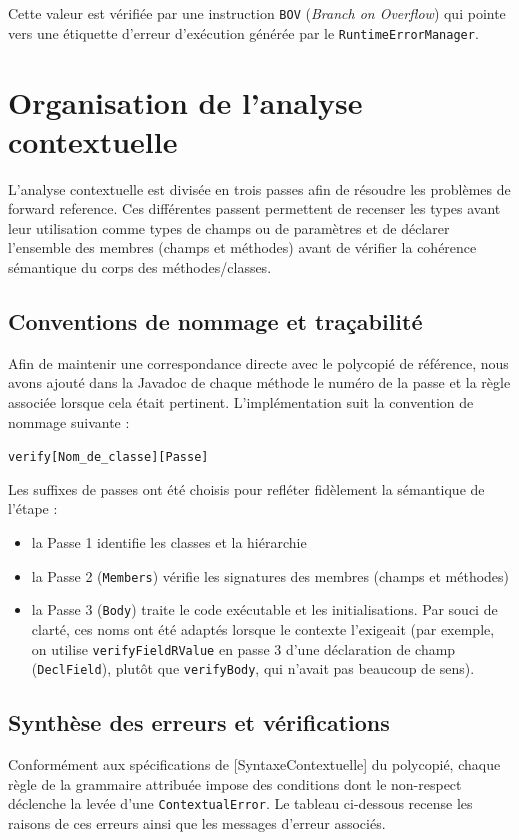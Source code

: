 \noindent
Cette valeur est vérifiée par une instruction \texttt{BOV} (\textit{Branch on Overflow}) qui pointe vers une étiquette d'erreur d'exécution générée par le \texttt{RuntimeErrorManager}.

\section{Organisation de l'analyse contextuelle}
\noindent
L'analyse contextuelle est divisée en trois passes afin de résoudre les problèmes de {forward reference}. Ces différentes passent permettent de recenser les types avant leur utilisation comme types de champs ou de paramètres et de déclarer l'ensemble des membres (champs et méthodes) avant de vérifier la cohérence sémantique du corps des méthodes/classes.

\subsection{Conventions de nommage et traçabilité}
\noindent
Afin de maintenir une correspondance directe avec le polycopié de référence, nous avons ajouté dans la Javadoc de chaque méthode le numéro de la passe et la règle associée lorsque cela était pertinent. L'implémentation suit la convention de nommage suivante :
\begin{center}
    \texttt{verify[Nom\_de\_classe][Passe]}
\end{center}
\noindent
Les suffixes de passes ont été choisis pour refléter fidèlement la sémantique de l'étape :
\begin{itemize}[label=$\circ$]
    \item la Passe 1 identifie les classes et la hiérarchie 
    \item la Passe 2 (\texttt{Members}) vérifie les signatures des membres (champs et méthodes)
    \item la Passe 3 (\texttt{Body}) traite le code exécutable et les initialisations. Par souci de clarté, ces noms ont été adaptés lorsque le contexte l'exigeait (par exemple, on utilise \texttt{verifyFieldRValue} en passe 3 d'une déclaration de champ (\texttt{DeclField}), plutôt que \texttt{verifyBody}, qui n'avait pas beaucoup de sens).
\end{itemize}

\subsection{Synthèse des erreurs et vérifications}
\noindent
Conformément aux spécifications de [SyntaxeContextuelle] du polycopié, chaque règle de la grammaire attribuée impose des conditions dont le non-respect déclenche la levée d'une \texttt{ContextualError}. Le tableau ci-dessous recense les raisons de ces erreurs ainsi que les messages d'erreur associés.

